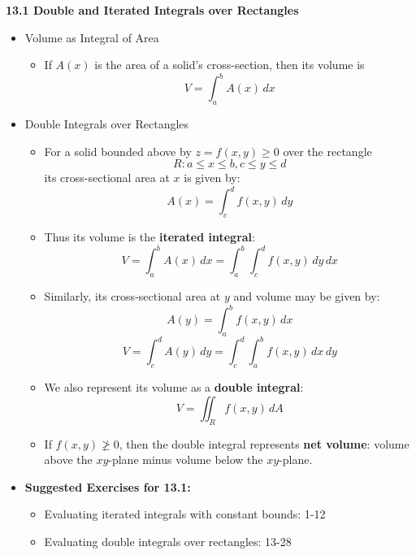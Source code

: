 \documentclass[12pt]{article}
\newcommand{\dvar}[1]{\,d{#1}}
\renewcommand{\d}[1]{\dvar{#1}}
\newcommand{\<}{\left<}
\renewcommand{\>}{\right>}
\begin{document}
  \newpage
  
  \centerline{\bf 13.1 Double and Iterated Integrals over Rectangles}
  
  \begin{itemize}

  \item Volume as Integral of Area

    \begin{itemize}
    \item If $A(x)$ is the area of a solid's cross-section, then its volume is
      \[
        V  = \int_a^b A(x)\d{x}
      \]
    \end{itemize}
  
  \item Double Integrals over Rectangles
  
    \begin{itemize}
    \item For a solid bounded above by $z=f(x,y)\geq 0$ over the rectangle \[R: a\leq x\leq b, c\leq y\leq d\] its cross-sectional area at $x$ is given by:
      \[
        A(x) = \int_c^d f(x,y)\d{y}
      \]
    \item Thus its volume is the \textbf{iterated integral}:
      \[
        V = \int_a^b A(x)\d{x} = \int_a^b\int_c^d f(x,y)\d{y}\d{x}
      \]
    \item Similarly, its cross-sectional area at $y$ and volume may be given by:
      \[
        A(y) = \int_a^b f(x,y)\d{x}
      \]
      \[
        V = \int_c^d A(y)\d{y} = \int_c^d\int_a^b f(x,y)\d{x}\d{y}
      \]
    \item We also represent its volume as a \textbf{double integral}:
      \[
        V = \iint_R f(x,y)\d{A}
      \]
    \item If $f(x,y)\not\geq 0$, then the double integral represents \textbf{net volume}: volume above the $xy$-plane minus volume below the $xy$-plane.
    \end{itemize}
    
  \item \textbf{Suggested Exercises for 13.1:}
  
    \begin{itemize}
    \item Evaluating iterated integrals with constant bounds: 1-12
    \item Evaluating double integrals over rectangles: 13-28
    \end{itemize}
    
  \end{itemize}
  
\end{document}

